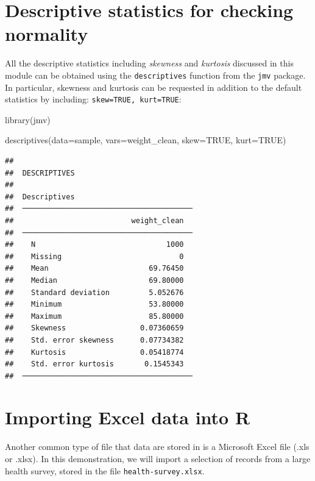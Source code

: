 \documentclass[
]{memoir}
\newenvironment{Shaded}{\begin{snugshade}}{\end{snugshade}}
\newcommand{\AttributeTok}[1]{\textcolor[rgb]{0.77,0.63,0.00}{#1}}
\newcommand{\ConstantTok}[1]{\textcolor[rgb]{0.00,0.00,0.00}{#1}}
\newcommand{\FunctionTok}[1]{\textcolor[rgb]{0.00,0.00,0.00}{#1}}
\newcommand{\NormalTok}[1]{#1}
\begin{document}
\hypertarget{descriptive-statistics-for-checking-normality}{%
\section{Descriptive statistics for checking normality}\label{descriptive-statistics-for-checking-normality}}

All the descriptive statistics including \emph{skewness} and \emph{kurtosis} discussed in this module can be obtained using the \texttt{descriptives} function from the \texttt{jmv} package. In particular, skewness and kurtosis can be requested in addition to the default statistics by including: \texttt{skew=TRUE,\ kurt=TRUE}:

\begin{Shaded}
\begin{Highlighting}[]
\FunctionTok{library}\NormalTok{(jmv)}

\FunctionTok{descriptives}\NormalTok{(}\AttributeTok{data=}\NormalTok{sample, }\AttributeTok{vars=}\NormalTok{weight\_clean, }\AttributeTok{skew=}\ConstantTok{TRUE}\NormalTok{, }\AttributeTok{kurt=}\ConstantTok{TRUE}\NormalTok{)}
\end{Highlighting}
\end{Shaded}

\begin{verbatim}
## 
##  DESCRIPTIVES
## 
##  Descriptives                            
##  ─────────────────────────────────────── 
##                           weight_clean   
##  ─────────────────────────────────────── 
##    N                              1000   
##    Missing                           0   
##    Mean                       69.76450   
##    Median                     69.80000   
##    Standard deviation         5.052676   
##    Minimum                    53.80000   
##    Maximum                    85.80000   
##    Skewness                 0.07360659   
##    Std. error skewness      0.07734382   
##    Kurtosis                 0.05418774   
##    Std. error kurtosis       0.1545343   
##  ───────────────────────────────────────
\end{verbatim}

\hypertarget{import-excel}{%
\section{Importing Excel data into R}\label{import-excel}}

Another common type of file that data are stored in is a Microsoft Excel file (.xls or .xlsx). In this demonstration, we will import a selection of records from a large health survey, stored in the file \texttt{health-survey.xlsx}.
\end{document}

